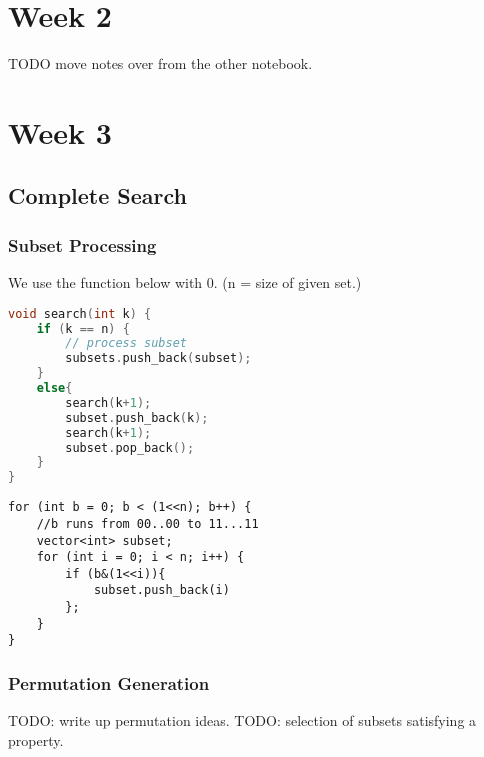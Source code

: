 \documentclass{article}
\begin{document}
\section{Week 2}
TODO move notes over from the other notebook.
\section{Week 3}
\subsection{Complete Search}
\subsubsection*{Subset Processing}
We use the function below with 0. (n = size of given set.)
\begin{lstlisting}[language=C++,caption=Subset Generation]
void search(int k) {
    if (k == n) {
        // process subset
        subsets.push_back(subset);
    }
    else{
        search(k+1);
        subset.push_back(k);
        search(k+1);
        subset.pop_back();
    }
}
\end{lstlisting}
\begin{lstlisting}
for (int b = 0; b < (1<<n); b++) {
    //b runs from 00..00 to 11...11
    vector<int> subset;
    for (int i = 0; i < n; i++) {
        if (b&(1<<i)){
            subset.push_back(i)
        };
    }
}
\end{lstlisting}
\subsubsection*{Permutation Generation}
TODO: write up permutation ideas.
TODO: selection of subsets satisfying a property.
\end{document}
